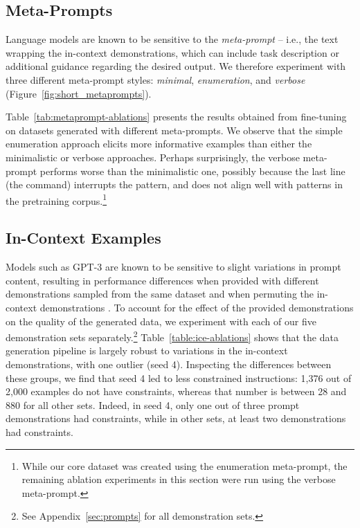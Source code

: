 \subsection{Meta-Prompts}
\label{sec:metaprompts_ablation}

Language models are known to be sensitive to the \textit{meta-prompt} -- i.e., the text wrapping the in-context demonstrations, which can include task description or additional guidance regarding the desired output. We therefore experiment with three different meta-prompt styles: \emph{minimal}, \emph{enumeration}, and \emph{verbose} (Figure~\ref{fig:short_metaprompts}).

Table~\ref{tab:metaprompt-ablations} presents the results obtained from fine-tuning on datasets generated with different meta-prompts. We observe that the simple enumeration approach elicits more informative examples than either the minimalistic or verbose approaches. Perhaps surprisingly, the verbose meta-prompt performs worse than the minimalistic one, possibly because the last line (the command) interrupts the pattern, and does not align well with patterns in the pretraining corpus.\footnote{While our core dataset was created using the enumeration meta-prompt, the remaining ablation experiments in this section were run using the verbose meta-prompt.}

\subsection{In-Context Examples}

Models such as GPT-3 are known to be sensitive to slight variations in prompt content, resulting in performance differences when provided with different demonstrations sampled from the same dataset \citep{liu-etal-2022-makes} and when permuting the in-context demonstrations \citep{kumar-talukdar-2021-reordering,lu-etal-2022-fantastically}. To account for the effect of the provided demonstrations on the quality of the generated data, we experiment with each of our five demonstration sets separately.\footnote{See Appendix~\ref{sec:prompts} for all demonstration sets.} 
Table~\ref{table:ice-ablations} shows that the data generation pipeline is largely robust to variations in the in-context demonstrations, with one outlier (seed 4). Inspecting the differences between these groups, we find that seed 4 led to less constrained instructions: 1,376 out of 2,000 examples do not have constraints, whereas that number is between 28 and 880 for all other sets. Indeed, in seed 4, only one out of three prompt demonstrations had constraints, while in other sets, at least two demonstrations had constraints.

